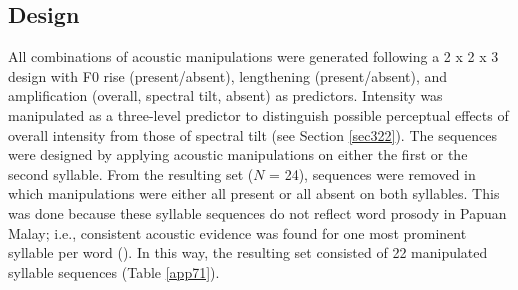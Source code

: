 \subsection{Design} \label{sec323}
All combinations of acoustic manipulations were generated following a 2 x 2 x 3 design with F0 rise (present/absent), lengthening (present/absent), and amplification (overall, spectral tilt, absent) as predictors. Intensity was manipulated as a three-level predictor to distinguish possible perceptual effects of overall intensity from those of spectral tilt (see Section \ref{sec322}). The sequences were designed by applying acoustic manipulations on either the first or the second syllable. From the resulting set ($N$ = 24), sequences were removed in which manipulations were either all present or all absent on both syllables. This was done because these syllable sequences do not reflect word prosody in Papuan Malay; i.e., consistent acoustic evidence was found for one most prominent syllable per word (). In this way, the resulting set consisted of 22 manipulated syllable sequences (Table \ref{app71}).

